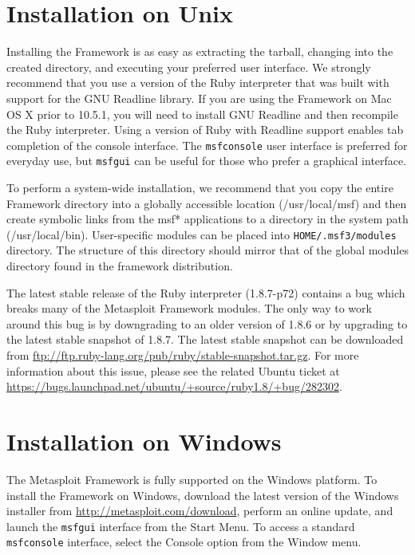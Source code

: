 \documentclass{report}
\begin{document}
    \section{Installation on Unix}
    \label{INSTALL-UNIX}
\par
Installing the Framework is as easy as extracting the tarball, changing into the
created directory, and executing your preferred user interface. We strongly
recommend that you use a version of the Ruby interpreter that was built with
support for the GNU Readline library. If you are using the Framework on Mac OS
X prior to 10.5.1, you will need to install GNU Readline and then recompile the Ruby
interpreter.  Using a version of Ruby with Readline support enables tab completion
of the console interface.  The \texttt{msfconsole} user interface is preferred for everyday
use, but \texttt{msfgui} can be useful for those who prefer a graphical interface.

\par
To perform a system-wide installation, we recommend that you copy the entire
Framework directory into a globally accessible location (/usr/local/msf) and
then create symbolic links from the msf* applications to a directory in the
system path (/usr/local/bin). User-specific modules can be placed into
\texttt{HOME/.msf3/modules} directory.  The structure of this directory should
mirror that of the global modules directory found in the framework
distribution.

\par
The latest stable release of the Ruby interpreter (1.8.7-p72) contains a bug which
breaks many of the Metasploit Framework modules. The only way to work around this 
bug is by downgrading to an older version of 1.8.6 or by upgrading to the latest
stable snapshot of 1.8.7. The latest stable snapshot can be downloaded from 
\url{ftp://ftp.ruby-lang.org/pub/ruby/stable-snapshot.tar.gz}. For more information
about this issue, please see the related Ubuntu ticket at
\url{https://bugs.launchpad.net/ubuntu/+source/ruby1.8/+bug/282302}.



    \section{Installation on Windows}
    \label{INSTALL-WIN32}

\par
The Metasploit Framework is fully supported on the Windows platform. To install the
Framework on Windows, download the latest version of the Windows installer from
\url{http://metasploit.com/download}, perform an online update, and launch the
\texttt{msfgui} interface from the Start Menu. To access a standard \texttt{msfconsole}
interface, select the Console option from the Window menu.
\end{document}
